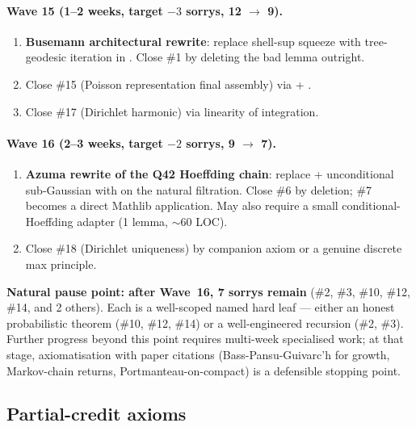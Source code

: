 \documentclass[11pt,a4paper]{article}
\theoremstyle{plain}
\theoremstyle{definition}
\begin{document}
\paragraph{Wave 15 (1--2 weeks, target $-3$ sorrys, 12 $\to$ 9).}
\begin{enumerate}[leftmargin=1.3em]
\item \textbf{Busemann architectural rewrite}: replace shell-sup squeeze
with tree-geodesic iteration in .
Close \#1 by deleting the bad lemma outright.
\item Close \#15 (Poisson representation final assembly) via
 + .
\item Close \#17 (Dirichlet harmonic) via linearity of integration.
\end{enumerate}

\paragraph{Wave 16 (2--3 weeks, target $-2$ sorrys, 9 $\to$ 7).}
\begin{enumerate}[leftmargin=1.3em]
\item \textbf{Azuma rewrite of the Q42 Hoeffding chain}: replace
 + unconditional sub-Gaussian with
 on the natural filtration. Close \#6 by
deletion; \#7 becomes a direct Mathlib application. May also require
a small conditional-Hoeffding adapter (1 lemma, $\sim$60 LOC).
\item Close \#18 (Dirichlet uniqueness) by companion axiom or a
genuine discrete max principle.
\end{enumerate}

\textbf{Natural pause point: after Wave~16, 7 sorrys remain} (\#2, \#3,
\#10, \#12, \#14, and 2 others). Each is a well-scoped named hard
leaf --- either an honest probabilistic theorem (\#10, \#12, \#14) or
a well-engineered recursion (\#2, \#3). Further progress beyond this
point requires multi-week specialised work; at that stage,
axiomatisation with paper citations (Bass-Pansu-Guivarc'h for growth,
Markov-chain returns, Portmanteau-on-compact) is a defensible
stopping point.

\subsection{Partial-credit axioms}
\end{document}
